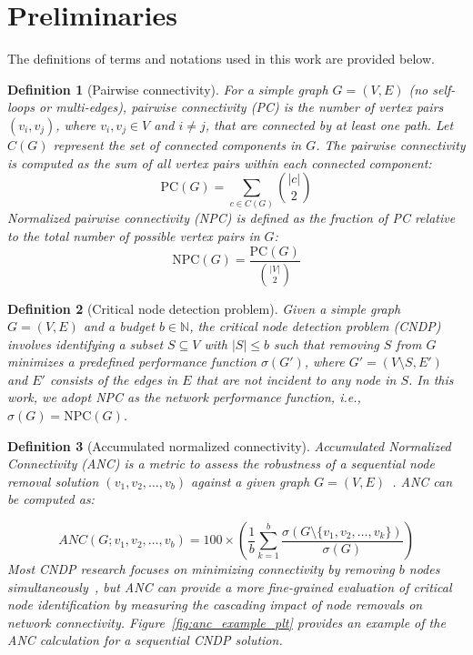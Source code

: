 \documentclass{article}
\newtheorem{definition}{Definition}
\begin{document}
\section{Preliminaries}

The definitions of terms and notations used in this work are provided below.

\begin{definition}[Pairwise connectivity]
For a simple graph $G = (V, E)$ (no self-loops or multi-edges), \emph{pairwise connectivity} (PC) is the number of vertex pairs $(v_i, v_j)$, where $v_i, v_j \in V$ and $i \neq j$, that are connected by at least one path. Let $C(G)$ represent the set of connected components in $G$. The pairwise connectivity is computed as the sum of all vertex pairs within each connected component:
\[
\text{PC}(G) = \sum_{c \in C(G)} \binom{|c|}{2}
\]
\emph{Normalized pairwise connectivity} (NPC) is defined as the fraction of PC relative to the total number of possible vertex pairs in $G$:
\[
\text{NPC}(G) = \frac{\text{PC}(G)}{\binom{|V|}{2}}
\]
\end{definition}
    
\begin{definition}[Critical node detection problem]
Given a simple graph $G = (V, E)$ and a budget $b \in \mathbb{N}$, the \emph{critical node detection problem} (CNDP) involves identifying a subset $S \subseteq V$ with $|S| \leq b$ such that removing $S$ from $G$ minimizes a predefined performance function $\sigma(G')$, where $G' = (V \setminus S, E')$ and $E'$ consists of the edges in $E$ that are not incident to any node in $S$. In this work, we adopt NPC as the network performance function, i.e., $\sigma(G) = \text{NPC}(G)$.
\end{definition}
    
\begin{definition}[Accumulated normalized connectivity]
 \emph{Accumulated Normalized Connectivity} (ANC) is a metric to assess the robustness of a sequential node removal solution $\left(v_1, v_2, \ldots, v_b\right)$ against a given graph $G=(V, E)$~\cite{fan2020finding,schneider2011mitigation}. ANC can be computed as:

 \[
ANC\left(G; v_1, v_2, \ldots, v_b\right) = 100 \times 
\left(\frac{1}{b} \sum_{k=1}^b \frac{\sigma\left(G \setminus \{v_1, v_2, \ldots, v_k\}\right)}{\sigma(G)}\right)
\]
Most CNDP research focuses on minimizing connectivity by removing $b$ nodes simultaneously~\citep{lalou2018critical}, but ANC can provide a more fine-grained evaluation of critical node identification by measuring the cascading impact of node removals on network connectivity. Figure~\ref{fig:anc_example_plt} provides an example of the ANC calculation for a sequential CNDP solution.
\end{definition}
\end{document}
